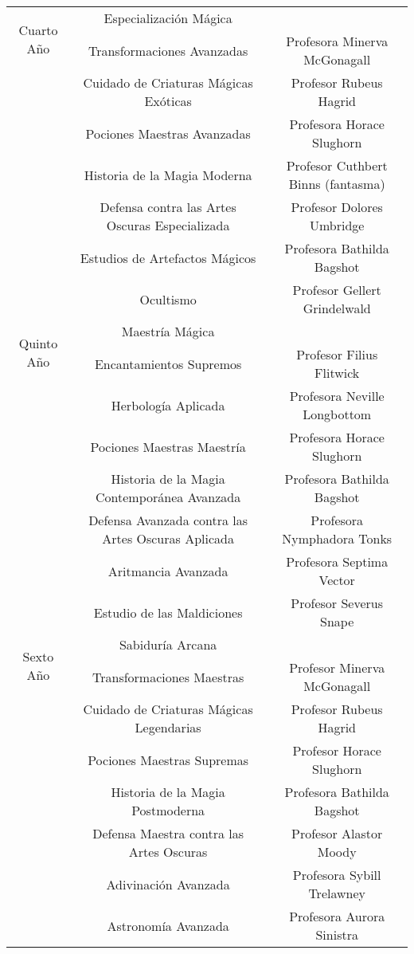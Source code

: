 \begin{table}[H]
\begin{tabular}{c|c|c}
  \multirow{2}{*}{Cuarto Año} & Especialización Mágica & \\
  & Transformaciones Avanzadas & Profesora Minerva McGonagall \\
  & Cuidado de Criaturas Mágicas Exóticas & Profesor Rubeus Hagrid \\
  & Pociones Maestras Avanzadas & Profesora Horace Slughorn \\
  & Historia de la Magia Moderna & Profesor Cuthbert Binns (fantasma) \\
  & Defensa contra las Artes Oscuras Especializada & Profesor Dolores Umbridge \\
  & Estudios de Artefactos Mágicos & Profesora Bathilda Bagshot \\
  & Ocultismo & Profesor Gellert Grindelwald \\ \hline
  \multirow{2}{*}{Quinto Año} & Maestría Mágica & \\
  & Encantamientos Supremos & Profesor Filius Flitwick \\
  & Herbología Aplicada & Profesora Neville Longbottom \\
  & Pociones Maestras Maestría & Profesora Horace Slughorn \\
  & Historia de la Magia Contemporánea Avanzada & Profesora Bathilda Bagshot \\
  & Defensa Avanzada contra las Artes Oscuras Aplicada & Profesora Nymphadora Tonks \\
  & Aritmancia Avanzada & Profesora Septima Vector \\
  & Estudio de las Maldiciones & Profesor Severus Snape \\ \hline
  \multirow{2}{*}{Sexto Año} & Sabiduría Arcana & \\
  & Transformaciones Maestras & Profesor Minerva McGonagall \\
  & Cuidado de Criaturas Mágicas Legendarias & Profesor Rubeus Hagrid \\
  & Pociones Maestras Supremas & Profesor Horace Slughorn \\
  & Historia de la Magia Postmoderna & Profesora Bathilda Bagshot \\
  & Defensa Maestra contra las Artes Oscuras & Profesor Alastor Moody \\
  & Adivinación Avanzada & Profesora Sybill Trelawney \\
  & Astronomía Avanzada & Profesora Aurora Sinistra
  \end{tabular}
  \end{table}
  




